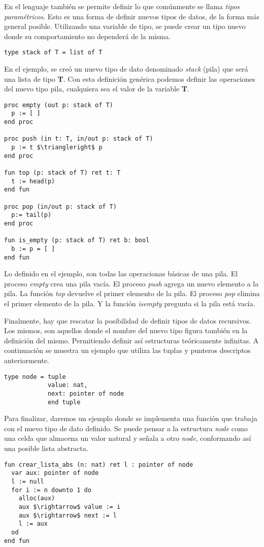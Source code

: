 \documentclass{article}
\begin{document}
En el lenguaje también se permite definir lo que comúnmente se llama \textit{tipos paramétricos}.
Esto es una forma de definir nuevos tipos de datos, de la forma más general posible.
Utilizando una variable de tipo, se puede crear un tipo nuevo donde su comportamiento no dependerá de la misma.

\begin{lstlisting}
type stack of T = list of T
\end{lstlisting}

En el ejemplo, se creó un nuevo tipo de dato denominado \textit{stack} (pila) que será una lista de tipo \textbf{T}.
Con esta definición genérica podemos definir las operaciones del nuevo tipo pila, cualquiera sea el valor de la variable \textbf{T}.

\begin{lstlisting}
proc empty (out p: stack of T)
  p := [ ]
end proc

proc push (in t: T, in/out p: stack of T)
  p := t $\triangleright$ p
end proc

fun top (p: stack of T) ret t: T
  t := head(p)
end fun

proc pop (in/out p: stack of T)
  p:= tail(p)
end proc

fun is_empty (p: stack of T) ret b: bool
  b := p = [ ]
end fun
\end{lstlisting}

Lo definido en el ejemplo, son todas las operacionas básicas de una pila.
El proceso \textit{empty} crea una pila vacía.
El proceso \textit{push} agrega un nuevo elemento a la pila.
La función \textit{top} devuelve el primer elemento de la pila.
El proceso \textit{pop} elimina el primer elemento de la pila.
Y la función \textit{is\gbajo empty} pregunta si la pila está vacía.

Finalmente, hay que rescatar la posibilidad de definir tipos de datos recursivos.
Los mismos, son aquellos donde el nombre del nuevo tipo figura también en la definición del mismo.
Permitiendo definir así estructuras teóricamente infinitas.
A continuación se muestra un ejemplo que utiliza las tuplas y punteros descriptos anteriormente.

\begin{lstlisting}
type node = tuple
            value: nat,
            next: pointer of node
            end tuple
\end{lstlisting}

Para finalizar, daremos un ejemplo donde se implementa una función que trabaja con el nuevo tipo de dato definido.
Se puede pensar a la estructura \textit{node} como una celda que almacena un valor natural y señala a otro \textit{node}, conformando así una posible lista abstracta.

\begin{lstlisting}
fun crear_lista_abs (n: nat) ret l : pointer of node
  var aux: pointer of node
  l := null
  for i := n downto 1 do
    alloc(aux)
    aux $\rightarrow$ value := i
    aux $\rightarrow$ next := l
    l := aux
  od
end fun
\end{lstlisting}
\end{document}
